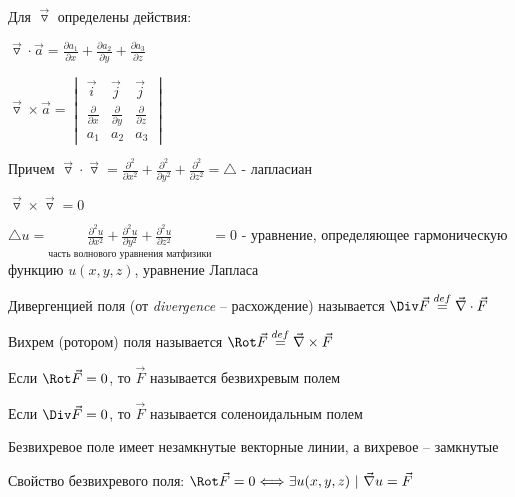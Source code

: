 \documentclass[12pt]{article}
\begin{document}
    \Nota Для $\overrightarrow{\triangledown}$ определены действия:

    $\overrightarrow{\triangledown} \cdot \overrightarrow{a} = \frac{\partial a_1}{\partial x} + \frac{\partial a_2}{\partial y} + \frac{\partial a_3}{\partial z}$

    $\overrightarrow{\triangledown} \times \overrightarrow{a} =
    \begin{vmatrix}
        \overrightarrow{i}          & \overrightarrow{j}          & \overrightarrow{j}          \\
        \frac{\partial}{\partial x} & \frac{\partial}{\partial y} & \frac{\partial}{\partial z} \\
        a_1                         & a_2                         & a_3
    \end{vmatrix}$

    Причем $\overrightarrow{\triangledown} \cdot \overrightarrow{\triangledown} = \frac{\partial^2}{\partial x^2} + \frac{\partial^2}{\partial y^2} + \frac{\partial^2}{\partial z^2} = \triangle$ - лапласиан

    $\overrightarrow{\triangledown} \times \overrightarrow{\triangledown} = 0$

    \Nota $\triangle u = \underset{\text{часть волнового уравнения матфизики}}{\frac{\partial^2 u}{\partial x^2} + \frac{\partial^2 u}{\partial y^2} + \frac{\partial^2 u}{\partial z^2}} = 0$ - уравнение, определяющее гармоническую функцию $u(x, y, z)$, уравнение Лапласа

    \hypertarget{divergence}{}

     Дивергенцией поля (от \textit{divergence} -- расхождение) называется
    $\Div \vec{F} \stackrel{def}{=} \vec\nabla \cdot \vec{F}$

    \hypertarget{rotor}{}

     Вихрем (ротором) поля называется $\Rot \vec{F} \stackrel{def}{=} \vec\nabla \times \vec{F}$

    \hypertarget{vectorfieldtypes}{}

     Если $\Rot \vec{F} = 0$, то $\vec{F}$ называется безвихревым полем

     Если $\Div \vec{F} = 0$, то $\vec{F}$ называется соленоидальным полем

    \Notas Безвихревое поле имеет незамкнутые векторные линии, а вихревое -- замкнутые

    \hypertarget{irrotationalfieldproperty}{}

    \begin{MyTheorem}
         Свойство безвихревого поля: $\Rot \vec{F} = 0 \Longleftrightarrow \exists u(x, y, z) \ | \ \vec\nabla u = \vec{F}$
    \end{MyTheorem}
\end{document}
